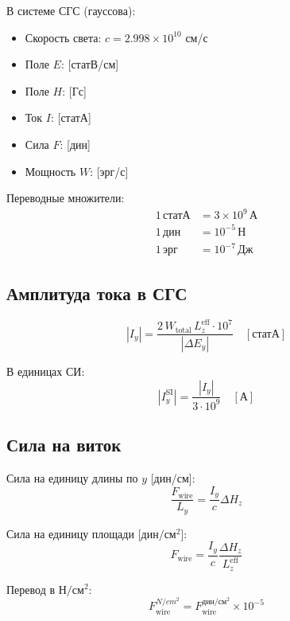 \documentclass[a4paper,12pt]{article}
\begin{document}
В системе СГС (гауссова):
\begin{itemize}
    \item Скорость света: $c = 2.998 \times 10^{10}$ см/с
    \item Поле $E$: [статВ/см]
    \item Поле $H$: [Гс]
    \item Ток $I$: [статА]
    \item Сила $F$: [дин]
    \item Мощность $W$: [эрг/с]
\end{itemize}

Переводные множители:
\begin{align}
1\,\text{статА} &= 3 \times 10^9\,\text{А} \\
1\,\text{дин} &= 10^{-5}\,\text{Н} \\
1\,\text{эрг} &= 10^{-7}\,\text{Дж}
\end{align}

\subsection{Амплитуда тока в СГС}

\begin{equation}
\boxed{
|I_y| = \frac{2\,W_{\text{total}}\,L_z^{\text{eff}} \cdot 10^7}{|\Delta E_y|} \quad [\text{статА}]
}
\end{equation}

В единицах СИ:
\begin{equation}
|I_y^{\text{SI}}| = \frac{|I_y|}{3 \cdot 10^9} \quad [\text{А}]
\end{equation}

\subsection{Сила на виток}

Сила на единицу длины по $y$ [дин/см]:
\begin{equation}
\frac{F_{\text{wire}}}{L_y} = \frac{I_y}{c} \Delta H_z
\end{equation}

Сила на единицу площади [$дин/см^2$]:
\begin{equation}
F_{\text{wire}} = \frac{I_y}{c} \frac{\Delta H_z}{L_z^{\text{eff}}}
\end{equation}

Перевод в $Н/см^2$:
\begin{equation}
F_{\text{wire}}^{{N/cm^2}} = F_{\text{wire}}^{{дин/см^2}} \times 10^{-5}
\end{equation}
\end{document}

